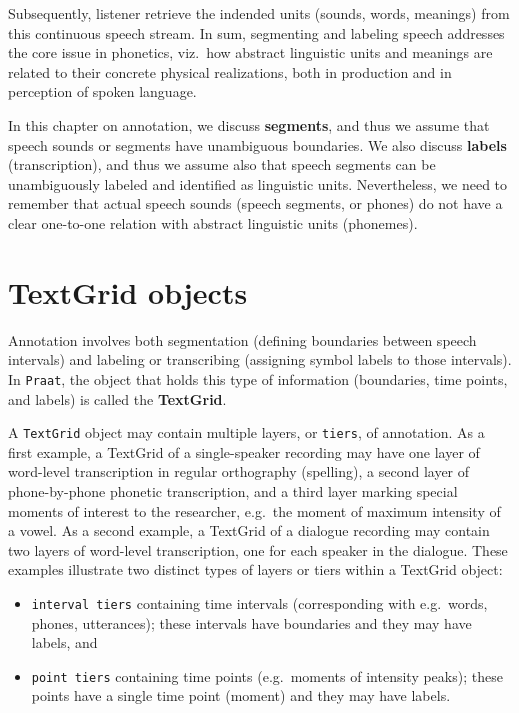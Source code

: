 \documentclass[
]{book}
\begin{document}
Subsequently, listener retrieve the indended units (sounds, words, meanings) from this continuous speech stream. In sum, segmenting and labeling speech addresses the core issue in phonetics, viz.~how abstract linguistic units and meanings are related to their concrete physical realizations, both in production and in perception of spoken language.

In this chapter on annotation, we discuss \textbf{segments}, and thus we assume that speech sounds or segments have unambiguous boundaries. We also discuss \textbf{labels} (transcription), and thus we assume also that speech segments can be unambiguously labeled and identified as linguistic units. Nevertheless, we need to remember that actual speech sounds (speech segments, or phones) do not have a clear one-to-one relation with abstract linguistic units (phonemes).

\label{box-praattextgrid}
\section{TextGrid objects}\label{sec:textgrids}

Annotation involves both segmentation (defining boundaries between speech intervals) and labeling or transcribing (assigning symbol labels to those intervals). In \texttt{Praat}, the object that holds this type of information (boundaries, time points, and labels) is called the \textbf{TextGrid}.

A \texttt{TextGrid} object may contain multiple layers, or \texttt{tiers}, of annotation. As a first example, a TextGrid of a single-speaker recording may have one layer of word-level transcription in regular orthography (spelling), a second layer of phone-by-phone phonetic transcription, and a third layer marking special moments of interest to the researcher, e.g.~the moment of maximum intensity of a vowel. As a second example, a TextGrid of a dialogue recording may contain two layers of word-level transcription, one for each speaker in the dialogue. These examples illustrate two distinct types of layers or tiers within a TextGrid object:

\begin{itemize}
\item
  \texttt{interval\ tiers} containing time intervals (corresponding with e.g.~words, phones, utterances); these intervals have boundaries and they may have labels, and
\item
  \texttt{point\ tiers} containing time points (e.g.~moments of intensity peaks); these points have a single time point (moment) and they may have labels.
\end{itemize}
\end{document}
